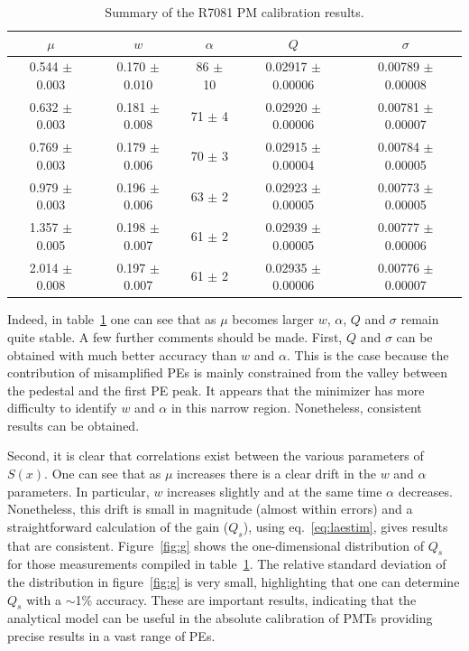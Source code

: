 \documentclass[preprint,12pt]{elsarticle}
\begin{document}
\begin{table}[h!]
\footnotesize
\centering
\begin{tabular}{| c  || c | c | c | c |}
\hline 
$\mu$  &  $w$ &  $\alpha$ &  $Q$ &  $\sigma$ \\[0.6ex] \hline\hline %
  0.544 $\pm$ 0.003 & 0.170 $\pm$  0.010 &  86 $\pm$ 10 & 0.02917  $\pm$ 0.00006 &  0.00789 $\pm$ 0.00008 \\ %
  0.632 $\pm$ 0.003 & 0.181 $\pm$  0.008 &  71 $\pm$ 4   & 0.02920  $\pm$ 0.00006 &  0.00781 $\pm$ 0.00007 \\ %
  0.769 $\pm$ 0.003 & 0.179 $\pm$  0.006 &  70 $\pm$ 3   & 0.02915  $\pm$ 0.00004 &  0.00784 $\pm$ 0.00005 \\ %
 0.979  $\pm$ 0.003 & 0.196 $\pm$  0.006 &  63 $\pm$ 2   & 0.02923  $\pm$ 0.00005 &  0.00773 $\pm$ 0.00005 \\ %
 1.357  $\pm$ 0.005 & 0.198 $\pm$  0.007 &  61 $\pm$ 2   & 0.02939  $\pm$ 0.00005 &  0.00777 $\pm$ 0.00006 \\ %
 2.014 $\pm$  0.008 & 0.197 $\pm$  0.007 &  61 $\pm$ 2   & 0.02935  $\pm$ 0.00006 &  0.00776 $\pm$ 0.00007 %
\\[0.6ex] \hline\hline
\end{tabular}
\caption{Summary of the R7081 PM calibration results.}
\label{tab:money}
\end{table}

Indeed, in table~\ref{tab:money} one can see that as $\mu$ becomes larger $w$, $\alpha$, $Q$ and $\sigma$ remain quite stable. %
A few further comments should be made. 
First, $Q$ and $\sigma$ can be obtained with much better accuracy than $w$ and $\alpha$. 
This is the case because the contribution of misamplified PEs is mainly constrained from the valley between the pedestal and the first PE peak. 
It appears that the minimizer has more difficulty to identify $w$ and $\alpha$ in this narrow region. 
Nonetheless, consistent results can be obtained. 

Second, it is clear that correlations exist between the various parameters of $S(x)$. 
One can see that as $\mu$ increases there is a clear drift in the $w$ and $\alpha$ parameters. 
In particular, $w$ increases slightly and at the same time $\alpha$ decreases. 
Nonetheless, this drift is small in magnitude (almost within errors) and a straightforward calculation of the gain ($Q_s$), using eq.~\eqref{eq:laestim}, gives results that are consistent. 
Figure~\ref{fig:g} shows the one-dimensional distribution of $Q_s$ for those measurements compiled in table~\ref{tab:money}. 
The relative standard deviation of the distribution in figure~\ref{fig:g} is very small, highlighting that one can determine $Q_s$ with a $\sim$1\% accuracy. 
These are important results, indicating that the analytical model can be useful in the absolute calibration of PMTs providing precise results in a vast range of PEs.
\end{document}
